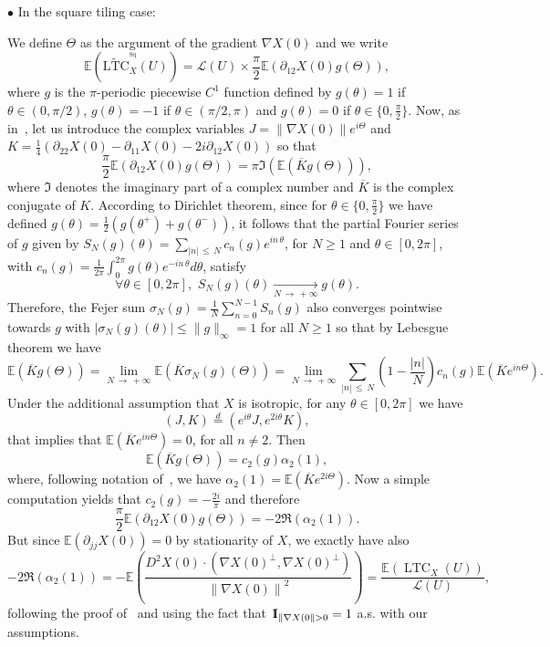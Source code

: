 \documentclass[10pt]{amsart}
\theoremstyle{definition}\newtheorem{defi}[theo]{Definition}\newtheorem{rema}[theo]{Remark}\newtheorem{exam}[theo]{Example}\newtheorem{exem}[theo]{Example}\newtheorem{nota}[theo]{Notation}
\newcommand{\E}{\mathbb{E}}
\newcommand{\ind}{{1\!\!\mathrm{I}}}
\DeclareMathOperator{\LTC}{LTC}
\DeclareMathOperator{\Sq}{Sq}
\newcommand{\tLTC}{\widetilde{\mathrm{LTC}}}
\newcommand{\calL}{\mathcal{L}}
\let\oldforall\forall
\renewcommand*{\forall}{\mathrel{\oldforall}}
\begin{document}
$\bullet$ In the square tiling case:

We define $\Theta$ as the argument of the gradient $\nabla X(0)$ and we write
\[
\E\left(\tLTC^{^{\Sq}}_{X}(U)\right)=\calL(U)\times \frac{\pi}{2}\E\left(\partial_{12}X(0)g(\Theta)\right),
\]
where $g$ is the $\pi$-periodic piecewise $C^1$ function defined by $g(\theta)=1$ if $\theta\in (0,\pi/2)$, $g(\theta)=-1$ if $\theta\in (\pi/2,\pi)$ and $g(\theta)=0$ if $\theta\in\{0,\frac{\pi}{2}\}$. Now, as in~\cite[the proof of Theorem~2]{BD-Geometry-published}, let us introduce the complex variables $J=\|\nabla X(0)\|e^{i\Theta}$ and\linebreak$K=\frac{1}{4}(\partial_{22}X(0)-\partial_{11}X(0)-2i\partial_{12}X(0))$ so that
\[
\frac{\pi}{2}\E\left(\partial_{12}X(0)g(\Theta)\right)=\pi\Im\left(\E\left(\overline{K}g(\Theta)\right)\right),
\]
where $\Im$ denotes the imaginary part of a complex number and $\overline{K}$ is the complex conjugate of $K$. According to Dirichlet theorem, since for $\theta\in \{0,\frac{\pi}{2}\}$ we have defined $g(\theta)=\frac{1}{2}(g(\theta^+)+g(\theta^-))$, it follows that the partial Fourier series of $g$ given by $S_N(g)(\theta)=\sum_{|n|\,\le\,N}c_n(g)e^{in\,\theta}$, for $N\ge 1$ and $\theta \in [0,2\pi]$, with $c_n(g)=\frac{1}{2\pi}\int_0^{2\pi}g(\theta)e^{-in\,\theta}d\theta$, satisfy
\[
\forall \theta \in [0,2\pi],\,\, S_N(g)(\theta)\underset{N\,\rightarrow\,+\infty}{\longrightarrow} g(\theta).
\]
Therefore, the Fejer sum $\sigma_N(g)=\frac{1}{N}\sum_{n=0}^{N-1}S_n(g)$ also converges pointwise towards $g$ with $|\sigma_N(g)(\theta)|\le \|g\|_\infty=1$ for all $N\ge 1$ so that by Lebesgue theorem we have
\[
\E\left(\overline{K}g(\Theta)\right)=\lim_{N\,\rightarrow\,+\infty}\E\left(\overline{K}\sigma_N(g)(\Theta)\right)=\lim_{N\,\rightarrow\,+\infty}\sum_{|n|\,\le\,N}\left(1-\frac{|n|}{N}\right)c_n(g)\E\left(\overline{K}e^{in\Theta}\right).
\]
Under the additional assumption that $X$ is isotropic, for any $\theta\in [0,2\pi]$ we have
\[
(J,K)\stackrel{d}{=}\left(e^{i\theta}J,e^{2i\theta}K\right),
\]
that implies that $\E\left(\overline{K}e^{in\Theta}\right)=0$, for all $n\neq 2$. Then
\[
\E\left(\overline{K}g(\Theta)\right)=c_2(g)\alpha_2(1),
\]
where, following notation of~\cite{BD-Geometry-published}, we have $\alpha_2(1)=\E(\overline{K}e^{2i\Theta})$. Now a simple computation yields that $c_2(g)=-\frac{2i}{\pi}$ and therefore
\[
\frac{\pi}{2}\E\left(\partial_{12}X(0)g(\Theta)\right)=-2\Re(\alpha_2(1)).
\]
But since $\E(\partial_{jj}X(0))=0$ by stationarity of $X$, we exactly have also
\[
-2\Re(\alpha_2(1))=-\E\left(\frac{D^2X(0)\cdot \left(\nabla X(0)^\perp,\nabla X(0)^\perp\right)}{\left\|\nabla X(0)\right\|^2}\right)=\frac{\E(\LTC_X(U))}{{\calL}(U)},
\]
following the proof of~\cite[Theorem~2]{BD-Geometry-published} and using the fact that $\ind_{\|\nabla X(0\|>0}\linebreak=1$ a.s. with our assumptions.
\vspace{3pt}
\end{document}
